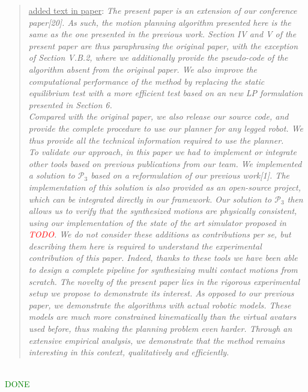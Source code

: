 \documentclass[a4paper]{article}
\newcommand{\done}[0]{\textcolor{green}{DONE}}
\newcommand\as[1]{\begin{quote} \underline{answer}: {#1}\end{quote} }
\newcommand\qt[1]{\begin{quote} \underline{added text in paper}: \textit{#1}\end{quote} \leavevmode \\ }
\begin{document}
\qt{The present paper is an extension of our conference paper[20]. As such, the motion planning algorithm presented here is the same as the one presented in the
previous work. Section IV and V of the present paper are thus paraphrasing the original paper, with the exception of Section V.B.2, where we additionally provide the pseudo-code of the algorithm absent from the original paper. We also improve the computational performance of the method by replacing the static equilibrium test with a more efficient test based on an new LP formulation presented in Section 6. \\
Compared with the original paper, we also release our source code, and provide the complete procedure to use our planner for any legged robot. We thus provide
all the technical information required to use the planner. \\
To validate our approach, in this paper we had to implement or integrate other tools based on previous publications from our team. We implemented a solution to $\mathcal{P}_3$ based on a reformulation of our previous work[1]. The implementation of this solution is also provided as an open-source project, which can be integrated directly in our framework. Our solution to $\mathcal{P}_3$ then allows us to verify that the synthesized motions are physically consistent, using our implementation of the state of the art simulator proposed in \textcolor{red}{TODO}.
We do not consider these additions as contributions per se, but describing them here is required to understand the experimental contribution of this paper.
Indeed, thanks to these tools we have been able to design a complete pipeline for synthesizing multi contact motions from scratch.
The novelty of the present paper lies in the rigorous experimental setup we propose to demonstrate its interest.
As opposed to our previous paper, we demonstrate the algorithms with actual robotic models. These models are much more constrained kinematically than the virtual avatars used before,
thus making the planning problem even harder. Through an extensive empirical analysis, we demonstrate that the method remains interesting in this context, qualitatively and efficiently.}
\done

\end{document}
